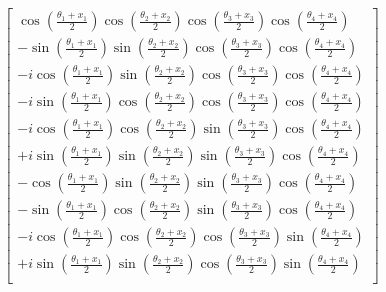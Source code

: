 \documentclass[12pt]{article}
\numberwithin{equation}{section}  %
\theoremstyle{definition}
\theoremstyle{plain}
\theoremstyle{remark}
\begin{document}
\begin{equation}
\begin{bmatrix}
\cos\left(\frac{\theta_1+x_1}{2}\right)
\cos\left(\frac{\theta_2+x_2}{2}\right)
\cos\left(\frac{\theta_3+x_3}{2}\right)
\cos\left(\frac{\theta_4+x_4}{2}\right)
\\[6pt]

-\sin\left(\frac{\theta_1+x_1}{2}\right)
\sin\left(\frac{\theta_2+x_2}{2}\right)
\cos\left(\frac{\theta_3+x_3}{2}\right)
\cos\left(\frac{\theta_4+x_4}{2}\right)
\\[6pt]

-i\cos\left(\frac{\theta_1+x_1}{2}\right)
\sin\left(\frac{\theta_2+x_2}{2}\right)
\cos\left(\frac{\theta_3+x_3}{2}\right)
\cos\left(\frac{\theta_4+x_4}{2}\right)
\\[6pt]

-i\sin\left(\frac{\theta_1+x_1}{2}\right)
\cos\left(\frac{\theta_2+x_2}{2}\right)
\cos\left(\frac{\theta_3+x_3}{2}\right)
\cos\left(\frac{\theta_4+x_4}{2}\right)
\\[6pt]

-i\cos\left(\frac{\theta_1+x_1}{2}\right)
\cos\left(\frac{\theta_2+x_2}{2}\right)
\sin\left(\frac{\theta_3+x_3}{2}\right)
\cos\left(\frac{\theta_4+x_4}{2}\right)
\\[6pt]

+i\sin\left(\frac{\theta_1+x_1}{2}\right)
\sin\left(\frac{\theta_2+x_2}{2}\right)
\sin\left(\frac{\theta_3+x_3}{2}\right)
\cos\left(\frac{\theta_4+x_4}{2}\right)
\\[6pt]

-\cos\left(\frac{\theta_1+x_1}{2}\right)
\sin\left(\frac{\theta_2+x_2}{2}\right)
\sin\left(\frac{\theta_3+x_3}{2}\right)
\cos\left(\frac{\theta_4+x_4}{2}\right)
\\[6pt]

-\sin\left(\frac{\theta_1+x_1}{2}\right)
\cos\left(\frac{\theta_2+x_2}{2}\right)
\sin\left(\frac{\theta_3+x_3}{2}\right)
\cos\left(\frac{\theta_4+x_4}{2}\right)
\\[6pt]

-i\cos\left(\frac{\theta_1+x_1}{2}\right)
\cos\left(\frac{\theta_2+x_2}{2}\right)
\cos\left(\frac{\theta_3+x_3}{2}\right)
\sin\left(\frac{\theta_4+x_4}{2}\right)
\\[6pt]

+i\sin\left(\frac{\theta_1+x_1}{2}\right)
\sin\left(\frac{\theta_2+x_2}{2}\right)
\cos\left(\frac{\theta_3+x_3}{2}\right)
\sin\left(\frac{\theta_4+x_4}{2}\right)
\\[6pt]


\end{bmatrix}
\end{equation}
\end{document}
